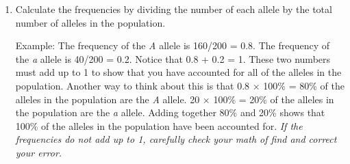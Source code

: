 \documentclass[12pt]{exam}
\newcommand{\allele}[1]{\textit{#1}}
\begin{document}
\begin{enumerate}
	\item Calculate the frequencies by dividing the number of each allele by the total number of alleles in the population.
	
	Example: The frequency of the \allele{A} allele is 160/200 = 0.8. The frequency of the \allele{a} allele is 40/200 = 0.2. Notice that 0.8 + 0.2 = 1. These two numbers must add up to 1 to show that you have accounted for all of the alleles in the population. Another way to think about this is that 0.8 $\times$ 100\% = 80\% of the alleles in the population are the \allele{A} allele. 20 $\times$ 100\% = 20\% of the alleles in the population are the \allele{a} allele. Adding together 80\% and 20\% shows that 100\% of the alleles in the population have been accounted for. \emph{If the frequencies do not add up to 1, carefully check your math of find and correct your error.}
	
\end{enumerate}
\end{document}
